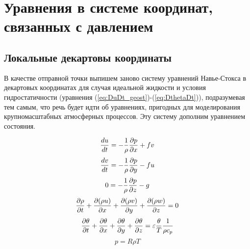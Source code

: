 \chapter{Уравнения в системе координат, связанных с давлением}

\section{{\color{done}Локальные декартовы координаты}}

    В качестве отправной точки выпишем заново систему уравнений Навье-Стокса в декартовых координатах для случая идеальной жидкости и условия гидростатичности (уравнения (\ref{eq:DuDt_geost})-(\ref{eq:DthetaDt})), подразумевая тем самым, что речь будет идти об уравнениях, пригодных для моделирования крупномасштабных атмосферных процессов. Эту систему дополним уравнением состояния.

    \begin{equation}
    \label{eq:ch6-DuDt_geost}
        \displaystyle\frac{d u}{d t} = -\frac{1}{\rho}\displaystyle\frac{\partial p}{\partial x}+fv 
    \end{equation} 
    \begin{equation}
    \label{eq:ch6-DvDt_geost}
        \displaystyle\frac{d v}{d t} = -\frac{1}{\rho}\displaystyle\frac{\partial p}{\partial y}-fu 
    \end{equation} 
    \begin{equation}
    \label{eq:ch6-DzDt_geost}
        0 = -\frac{1}{\rho}\displaystyle\frac{\partial p}{\partial z}-g 
    \end{equation} 
    \begin{equation}
    \label{eq:ch6-masscons}
        \displaystyle\frac{\partial \rho}{\partial t} + \displaystyle\frac{\partial (\rho u)}{\partial x} + \displaystyle\frac{\partial (\rho v)}{\partial y} + \displaystyle\frac{\partial (\rho w)}{\partial z} = 0 
    \end{equation} 
    \begin{equation}
    \label{eq:ch6-Tcons} %
        \pd{\theta}{t} + \pd{\theta}{x} + \pd{\theta}{y} + \pd{\theta}{z} = \varepsilon\frac{\theta}{T} \frac{1}{\rho c_p} 
    \end{equation} 
    \begin{equation}
        \label{eq:ch6-idealGas}
        p = R\rho T
    \end{equation} 

